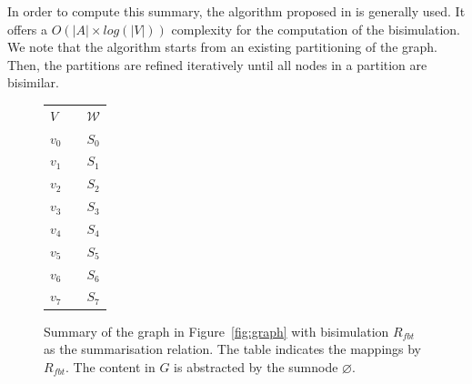 In order to compute this summary, the algorithm proposed in \cite{Paige:1987:TPR:37185.37186} is generally used. It offers a $O\left( \vert A \vert \times log\left( \vert V \vert \right) \right)$ complexity for the computation of the bisimulation. We note that the algorithm starts from an existing partitioning of the graph. Then, the partitions are refined iteratively until all nodes in a partition are bisimilar.%

\begin{figure}
	\centering
	\begin{minipage}{.75\textwidth}
		\resizebox{\textwidth}{!}{
			
		}
	\end{minipage}
	\quad
	\begin{minipage}[h]{.2\textwidth}
		\centering
		\caption*{$R_{fbt}\left(V, \mathcal{W}\right)$}
		\begin{tabular}{lc@{\hs}l}
			\toprule
			$V$ & \phantom{a} & $\mathcal{W}$ \\
			\cmidrule{1-1} \cmidrule{3-3}
			$v_0$ & \phantom{a} & $S_0$ \\
			$v_1$ & \phantom{a} & $S_1$ \\
			$v_2$ & \phantom{a} & $S_2$ \\
			$v_3$ & \phantom{a} & $S_3$ \\
			$v_4$ & \phantom{a} & $S_4$ \\
			$v_5$ & \phantom{a} & $S_5$ \\
			$v_6$ & \phantom{a} & $S_6$ \\
			$v_7$ & \phantom{a} & $S_7$ \\
			\bottomrule
		\end{tabular}
	\end{minipage}
	\caption{Summary of the graph in Figure~\ref{fig:graph} with bisimulation $R_{fbt}$ as the summarisation relation. The table indicates the mappings by $R_{fbt}$. The content in $G$ is abstracted by the sumnode $\varnothing$.}
	\label{fig:fbb-summary}
\end{figure}


